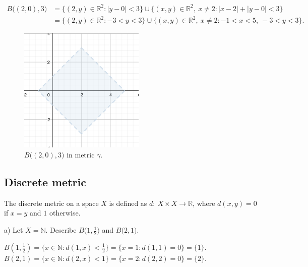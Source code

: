 \documentclass[a4paper,11pt]{article}
\begin{document}
\begin{align*} 
    B \big((2, 0), 3 \big) &= \{(2,y) \in \mathbb{R}^2 : |y - 0| < 3 \} \cup \{(x,y) \in \mathbb{R}^2, \ x \neq 2 : |x - 2| + |y - 0| < 3 \}
    \\
    &= \{(2,y) \in \mathbb{R}^2 : -3 < y < 3 \} \cup \{(x,y) \in \mathbb{R}^2 , \ x \neq 2: -1 < x < 5, \ -3< y < 3 \}.
\end{align*}

\begin{figure}[ht!]
    \centering
    \includegraphics[width=60mm]{d3.png}
    \caption{$B \big((2, 0), 3 \big)$ in metric $\gamma$.}
\end{figure}




\newpage
\subsection{Discrete metric}
The discrete metric on a space $X$ is defined as $d: \ X \times X \to \mathbb{R}$, where $d(x, y) = 0$ if $x = y$ and $1$ otherwise.

\noindent
a) Let $X = \mathbb{N}$. Describe $B \big(1, \frac{1}{2} \big)$ and $B \big(2, 1 \big)$.

\begin{center}
$ B \left(1, \frac{1}{2} \right) = \{ x \in \mathbb{N} : d(1, x) < \frac{1}{2} \} = \{ x = 1 : d(1, 1) = 0 \} = \{ 1 \}. $
\\
$ B (2, 1) = \{ x \in \mathbb{N} : d(2, x) < 1 \} = \{ x = 2 : d(2, 2) = 0 \} = \{ 2 \}. $
\\
\end{center}

\end{document}
